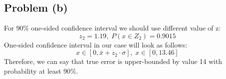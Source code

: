 \subsection*{Problem (b)}

For 90\% one-sided confidence interval we should use different value of z:
 \[
z_2=1.19,\; P(x\in Z_2)=0.9015
\]
One-sided confidence interval in our case will look as follows:
 \[
x\in [0, \bar{x}+z_2\cdot\sigma],\;
x\in [0, 13.46]
\]
Therefore, we can say that true error is upper-bounded by value 14 with probability at least 90\%.
